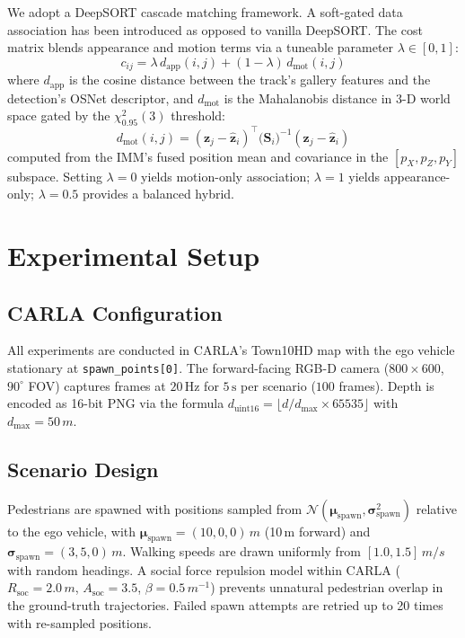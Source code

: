 \documentclass[conference]{IEEEtran}
\begin{document}
We adopt a DeepSORT cascade matching framework. A soft-gated data association has been introduced as opposed to vanilla DeepSORT. The cost matrix blends appearance and motion terms via a tuneable parameter $\lambda \in [0, 1]$:
\begin{equation}
\label{eq:cost}
c_{ij} = \lambda \, d_{\text{app}}(i, j) + (1 - \lambda) \, d_{\text{mot}}(i, j)
\end{equation}
where $d_{\text{app}}$ is the cosine distance between the track's gallery features and the detection's OSNet descriptor, and $d_{\text{mot}}$ is the Mahalanobis distance in 3-D world space gated by the $\chi^2_{0.95}(3)$ threshold:
\begin{equation}
d_{\text{mot}}(i, j) = (\mathbf{z}_j - \hat{\mathbf{z}}_i)^\top \bigl(\mathbf{S}_i\bigr)^{-1} (\mathbf{z}_j - \hat{\mathbf{z}}_i)
\end{equation}
computed from the IMM's fused position mean and covariance in the $[p_X, p_Z, p_Y]$ subspace. Setting $\lambda{=}0$ yields motion-only association; $\lambda{=}1$ yields appearance-only; $\lambda{=}0.5$ provides a balanced hybrid.

\section{Experimental Setup}
\label{sec:experiments}

\subsection{CARLA Configuration}
All experiments are conducted in CARLA's Town10HD map with the ego vehicle stationary at \texttt{spawn\_points[0]}. The forward-facing RGB-D camera ($800{\times}600$, $90^\circ$ FOV) captures frames at $20\,\text{Hz}$ for $5\,\text{s}$ per scenario ($100$ frames). Depth is encoded as 16-bit PNG via the formula $d_{\text{uint16}} = \lfloor d / d_{\max} \times 65535 \rfloor$ with $d_{\max} = 50\,\si{m}$.

\subsection{Scenario Design}
Pedestrians are spawned with positions sampled from $\mathcal{N}(\bm{\mu}_{\text{spawn}}, \bm{\sigma}_{\text{spawn}}^2)$ relative to the ego vehicle, with $\bm{\mu}_{\text{spawn}} = (10, 0, 0)\,\si{m}$ (10\,m forward) and $\bm{\sigma}_{\text{spawn}} = (3, 5, 0)\,\si{m}$. Walking speeds are drawn uniformly from $[1.0, 1.5]\,\si{m/s}$ with random headings. A social force repulsion model within CARLA (\mbox{$R_{\text{soc}} = 2.0\,\si{m}$}, \mbox{$A_{\text{soc}} = 3.5$}, \mbox{$\beta = 0.5\,\si{m^{-1}}$}) prevents unnatural pedestrian overlap in the ground-truth trajectories. Failed spawn attempts are retried up to 20 times with re-sampled positions.
\end{document}
